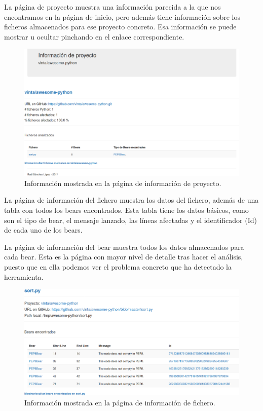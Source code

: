 \documentclass[a4paper, 12pt]{book}
\begin{document}
La página de proyecto muestra una información parecida a la que nos encontramos en la página de inicio, pero además tiene información sobre los ficheros almacenados para ese proyecto concreto. Esa información se puede mostrar u ocultar pinchando en el enlace correspondiente.
\begin{figure}[H]
  \centering
  \includegraphics[width=16cm, keepaspectratio]{img/infoProyecto}
  \caption{Información mostrada en la página de información de proyecto.}
  \label{fig:infoProyecto}
\end{figure}

La página de información del fichero muestra los datos del fichero, además de una tabla con todos los bears encontrados. Esta tabla tiene los datos básicos, como son el tipo de bear, el mensaje lanzado, las líneas afectadas y el identificador (Id) de cada uno de los bears.

La página de información del bear muestra todos los datos almacenados para cada bear. Esta es la página con mayor nivel de detalle tras hacer el análisis, puesto que en ella podemos ver el problema concreto que ha detectado la herramienta.

\begin{figure}[H]
  \centering
  \includegraphics[width=16cm, keepaspectratio]{img/infoFichero}
  \caption{Información mostrada en la página de información de fichero.}
  \label{fig:infoFichero}
\end{figure}
\end{document}
